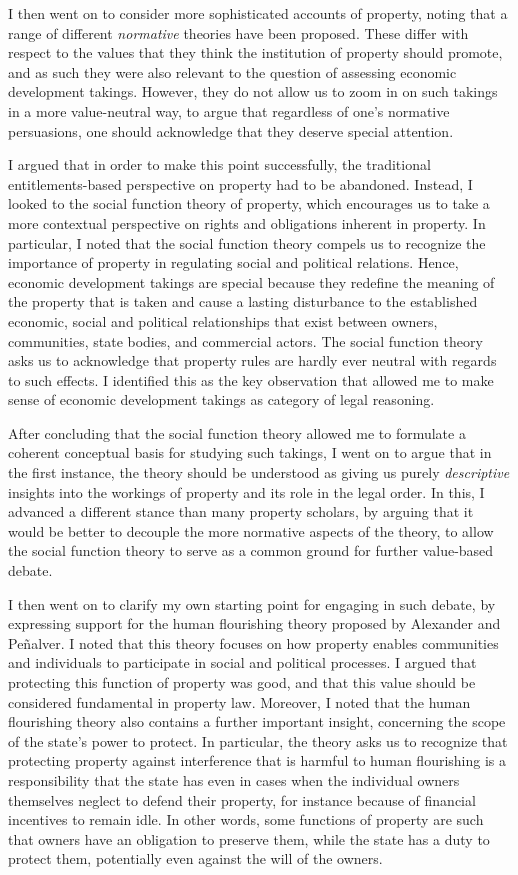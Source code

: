\documentclass[12pt,a4paper]{book} %
\begin{document}
I then went on to consider more sophisticated accounts of property, noting that a range of different {\it normative} theories have been proposed. These differ with respect to the values that they think the institution of property should promote, and as such they were also relevant to the question of assessing economic development takings. However, they do not allow us to zoom in on such takings in a more value-neutral way, to argue that regardless of one's normative persuasions, one should acknowledge that they deserve special attention.

I argued that in order to make this point successfully, the traditional entitlements-based perspective on property had to be abandoned. Instead, I looked to the social function theory of property, which encourages us to take a more contextual perspective on rights and obligations inherent in property. In particular, I noted that the social function theory compels us to recognize the importance of property in regulating social and political relations. Hence, economic development takings are special because they redefine the meaning of the property that is taken and cause a lasting disturbance to the established economic, social and political relationships that exist between owners, communities, state bodies, and commercial actors. The social function theory asks us to acknowledge that property rules are hardly ever neutral with regards to such effects. I identified this as the key observation that allowed me to make sense of economic development takings as category of legal reasoning.

After concluding that the social function theory allowed me to formulate a coherent conceptual basis for studying such takings, I went on to argue that in the first instance, the theory should be understood as giving us purely {\it descriptive} insights into the workings of property and its role in the legal order. In this, I advanced a different stance than many property scholars, by arguing that it would be better to decouple the more normative aspects of the theory, to allow the social function theory to serve as a common ground for further value-based debate.

I then went on to clarify my own starting point for engaging in such debate, by expressing support for the human flourishing theory proposed by Alexander and Pe\~{n}alver. I noted that this theory focuses on how property enables communities and individuals to  participate in social and political processes. I argued that protecting this function of property was good, and that this value should be considered fundamental in property law. Moreover, I noted that the human flourishing theory also contains a further important insight, concerning the scope of the state's power to protect. In particular, the theory asks us to recognize that protecting property against interference that is harmful to human flourishing is a responsibility that the state has even in cases when the individual owners themselves neglect to defend their property, for instance because of financial incentives to remain idle. In other words, some functions of property are such that owners have an obligation to preserve them, while the state has a duty to protect them, potentially even against the will of the owners.
\end{document}
